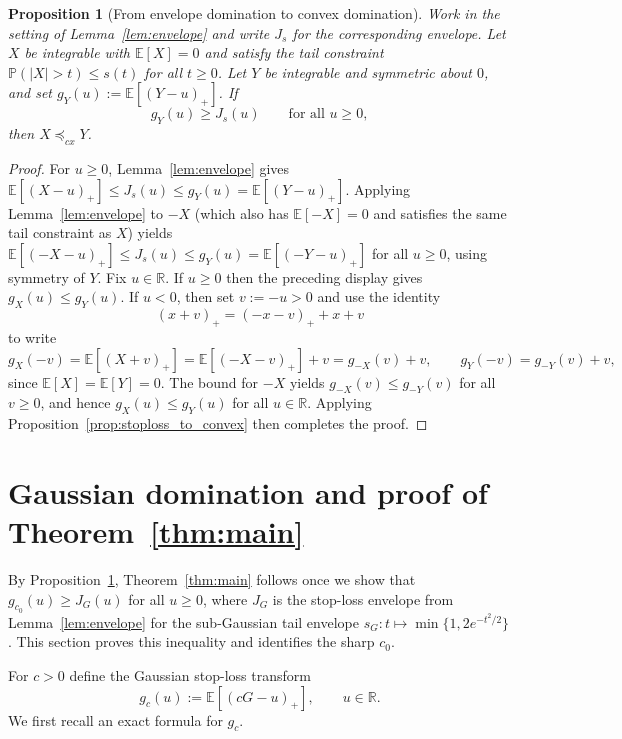 \documentclass[11pt]{article}
\newcommand{\R}{\mathbb{R}}
\newcommand{\Pbb}{\mathbb{P}}
\newcommand{\Ebb}{\mathbb{E}}
\newtheorem{proposition}[theorem]{Proposition}
\begin{document}
\begin{proposition}[From envelope domination to convex domination]\label{prop:envelope_to_cx}
Work in the setting of Lemma~\ref{lem:envelope} and write $J_s$ for the corresponding envelope.
Let $X$ be integrable with $\Ebb [X] = 0$ and satisfy the tail constraint $\Pbb( |X| > t) \le s(t)$ for all $t\ge 0$.
Let $Y$ be integrable and symmetric about $0$, and set $g_Y (u) := \Ebb[(Y - u)_+]$.
If
%
\[
g_Y(u) \ge J_s(u) \qquad\text{for all } u\ge 0,
\]
%
then $X \preceq_{cx} Y$.
\end{proposition}


\begin{proof}
For $u \ge 0$, Lemma~\ref{lem:envelope} gives $\Ebb [(X - u)_+] \le J_s(u)\le g_Y(u) = \Ebb[(Y - u)_+]$.
Applying Lemma~\ref{lem:envelope} to $-X$ (which also has $\Ebb [ -X ] = 0$ and satisfies the same tail constraint as $X$) yields
$\Ebb[(- X - u)_+] \le J_s (u) \le g_Y (u) =\Ebb[(- Y - u)_+ ]$ for all $u \ge 0$, using symmetry of $Y$.
Fix $u \in \R$. If $u \ge 0$ then the preceding display gives $g_X (u) \le g_Y (u)$.
If $u < 0$, then set $v := - u > 0$ and use the identity
%
\[
(x + v)_+ = (- x - v)_+ + x + v
\]
%
to write
%
\[
g_X(-v) = \Ebb [(X + v)_+] = \Ebb [(- X - v)_+] + v = g_{-X}(v) + v,
\qquad
g_Y (-v) = g_{-Y} (v) + v,
\]
%
since $\Ebb [X] = \Ebb [Y] = 0$. The bound for $-X$ yields $g_{-X} (v) \le g_{-Y} (v)$ for all $v\ge 0$, and hence $g_X(u) \le g_Y(u)$ for all $u \in \R$. Applying Proposition~\ref{prop:stoploss_to_convex} then completes the proof.
\end{proof}


\section{Gaussian domination and proof of Theorem~\ref{thm:main}}

By Proposition~\ref{prop:envelope_to_cx}, Theorem~\ref{thm:main} follows once we show that $g_{c_0}(u) \ge J_G (u)$ for all $u \ge 0$, where $J_G$ is the stop-loss envelope from Lemma~\ref{lem:envelope} for the sub-Gaussian tail envelope $s_G : t\mapsto \min\{1, 2e^{-t^2/2}\}$. This section proves this inequality and identifies the sharp $c_0$.

For $c>0$ define the Gaussian stop-loss transform
%
\begin{equation}
\label{eq:gcdef}
g_c(u) := \Ebb[(c G - u)_+], \qquad u \in\R.
\end{equation}
%
We first recall an exact formula for $g_c$.
\end{document}
